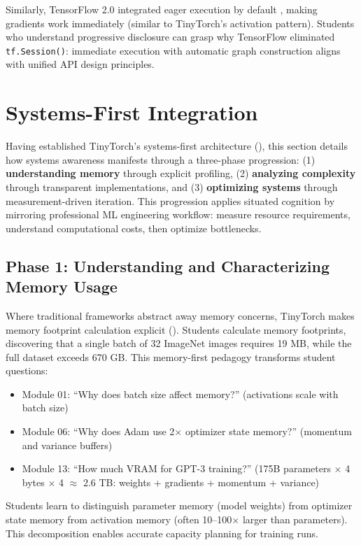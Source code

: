 \documentclass[10pt,twocolumn]{article}
\begin{document}
Similarly, TensorFlow 2.0 integrated eager execution by default \citep{tensorflow20}, making gradients work immediately (similar to TinyTorch's activation pattern). Students who understand progressive disclosure can grasp why TensorFlow eliminated \texttt{tf.Session()}: immediate execution with automatic graph construction aligns with unified API design principles.

\section{Systems-First Integration}
\label{sec:systems}

Having established TinyTorch's systems-first architecture (), this section details how systems awareness manifests through a three-phase progression: (1) \textbf{understanding memory} through explicit profiling, (2) \textbf{analyzing complexity} through transparent implementations, and (3) \textbf{optimizing systems} through measurement-driven iteration. This progression applies situated cognition \citep{lave1991} by mirroring professional ML engineering workflow: measure resource requirements, understand computational costs, then optimize bottlenecks.

\subsection{Phase 1: Understanding and Characterizing Memory Usage}

Where traditional frameworks abstract away memory concerns, TinyTorch makes memory footprint calculation explicit (). Students calculate memory footprints, discovering that a single batch of 32 ImageNet images requires 19 MB, while the full dataset exceeds 670 GB. This memory-first pedagogy transforms student questions:

\begin{itemize}
\item Module 01: ``Why does batch size affect memory?'' (activations scale with batch size)
\item Module 06: ``Why does Adam use 2$\times$ optimizer state memory?'' (momentum and variance buffers)
\item Module 13: ``How much VRAM for GPT-3 training?'' (175B parameters $\times$ 4 bytes $\times$ 4 $\approx$ 2.6 TB: weights + gradients + momentum + variance)
\end{itemize}

Students learn to distinguish parameter memory (model weights) from optimizer state memory from activation memory (often 10--100$\times$ larger than parameters). This decomposition enables accurate capacity planning for training runs.
\end{document}
